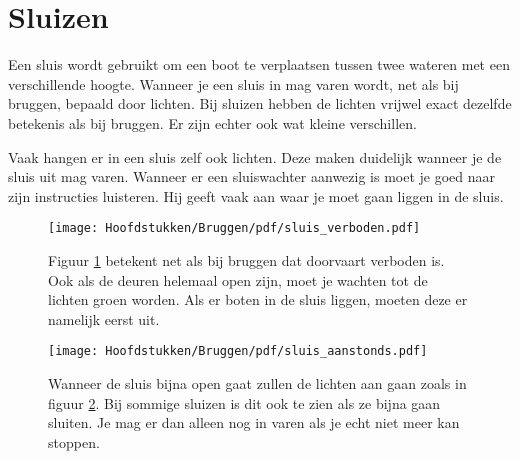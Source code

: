 \section{Sluizen}
Een sluis wordt gebruikt om een boot te verplaatsen tussen twee wateren met een verschillende hoogte. Wanneer je een sluis in mag varen wordt, net als bij bruggen, bepaald door lichten.
Bij sluizen hebben de lichten vrijwel exact dezelfde betekenis als bij bruggen. Er zijn echter ook wat kleine verschillen. 

Vaak hangen er in een sluis zelf ook lichten. Deze maken duidelijk wanneer je de sluis uit mag varen. Wanneer er een sluiswachter aanwezig is moet je goed naar zijn instructies luisteren. Hij geeft vaak aan waar je moet gaan liggen in de sluis. 

\hfill
\begin{figure}[H]
	\centering
	\begin{minipage}[b]{0.18\textwidth}
		\texttt{[image: Hoofdstukken/Bruggen/pdf/sluis\_verboden.pdf]}
		\caption{}
		\label{pic:sluis:verbod}
	\end{minipage}
	\hfill
	\begin{minipage}[t]{0.75\textwidth}
		\vspace{-2cm}
		Figuur \ref{pic:sluis:verbod} betekent net als bij bruggen dat doorvaart verboden is. Ook als de deuren helemaal open zijn, moet je wachten tot de lichten groen worden. Als er boten in de sluis liggen, moeten deze er namelijk eerst uit.
	\end{minipage}
\end{figure}
\vspace{-0.35cm}
\begin{figure}[H]
	\centering
	\begin{minipage}[b]{0.18\textwidth}	
		\texttt{[image: Hoofdstukken/Bruggen/pdf/sluis\_aanstonds.pdf]}
		\caption{}
		\label{pic:sluis:aanstonds}
	\end{minipage}
	\hfill
	\begin{minipage}[t]{0.75\textwidth}
		\vspace{-2cm}
		Wanneer de sluis bijna open gaat zullen de lichten aan gaan zoals in figuur \ref{pic:sluis:aanstonds}. Bij sommige sluizen is dit ook te zien als ze bijna gaan sluiten. Je mag er dan alleen nog in varen als je echt niet meer kan stoppen.
	\end{minipage}
\end{figure}
\vspace{-0.35cm}

